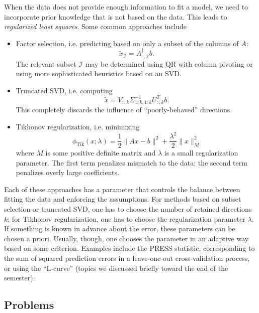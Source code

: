 \documentclass[12pt, leqno]{article}
\begin{document}
When the data does not provide enough information to fit a model,
we need to incorporate prior knowledge that is not based on the data.
This leads to {\em regularized least squares}.  Some common
approaches include
\begin{itemize}
\item Factor selection, i.e. predicting based on only a subset of
  the columns of $A$:
  \[
    \tilde{x}_{\mathcal{I}} = A_{:,\mathcal{I}}^\dagger b.
  \]
  The relevant subset $\mathcal{I}$ may be determined using QR with column
  pivoting or using more sophisticated heuristics based on an SVD.
\item Truncated SVD, i.e. computing
  \[
    \tilde{x} = V_{:,k} \Sigma_{1:k,1:k}^{-1} U_{:,k}^T b.
  \]
  This completely discards the influence of ``poorly-behaved'' directions.
\item Tikhonov regularization, i.e. minimizing
  \[
    \phi_{\mbox{Tik}}(x; \lambda) = \frac{1}{2} \|Ax-b\|^2 + \frac{\lambda^2}{2} \|x\|_M^2
  \]
  where $M$ is some positive definite matrix and $\lambda$ is a small
  regularization parameter.  The first term penalizes mismatch to the
  data; the second term penalizes overly large coefficients.
\end{itemize}
Each of these approaches has a parameter that controls the balance
between fitting the data and enforcing the assumptions.  For methods
based on subset selection or truncated SVD, one has to choose the
number of retained directions $k$; for Tikhonov regularization, one
has to choose the regularization parameter $\lambda$.  If something is
known in advance about the error, these parameters can be chosen a
priori.  Usually, though, one chooses the parameter in an adaptive
way based on some criterion.  Examples include the PRESS statistic,
corresponding to the sum of squared prediction errors in a
leave-one-out cross-validation process, or using the ``L-curve''
(topics we discussed briefly toward the end of the semester).

\subsection{Problems}
\end{document}
